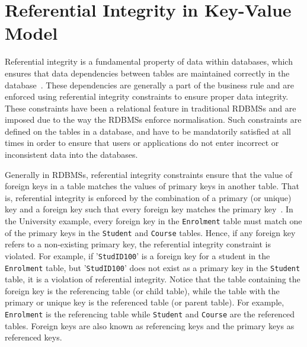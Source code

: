 \section{Referential Integrity in Key-Value
Model}\label{s:referential-integrity} 

Referential integrity is a fundamental property of data within databases, which
ensures that data dependencies between tables are maintained correctly in the
database~\citep{blaha,date,Navathe,george}.  These dependencies are generally a
part of the business rule and are enforced using referential integrity
constraints to ensure proper data integrity. These  constraints
have been a relational feature in traditional \acp{RDBMS} and are imposed due to
the way the \acp{RDBMS} enforce normalisation. Such  constraints are defined on
the tables in a database, and have to be mandatorily satisfied at all times in
order to ensure that users or applications do not enter incorrect or
inconsistent data into the databases.



Generally in \acp{RDBMS}, referential integrity constraints  ensure that the
value of foreign keys in a table matches the values of primary keys in another
table. That is, referential integrity is enforced by the combination of a
primary (or unique) key and a foreign key such that every foreign key matches
the primary key~\citep{blaha,Navathe,george,pathivada}.
In the University example,   every foreign key in the \texttt{Enrolment} table
must match one of the primary keys in the \texttt{Student} and \texttt{Course}
tables. Hence,   if any foreign key refers to a non-existing primary key,   the
referential integrity constraint is violated.   For example,   if
'\texttt{StudID100}' is a foreign key for a student in the \texttt{Enrolment}
table,   but '\texttt{StudID100}' does not exist as a primary key in the
\texttt{Student} table,   it is a violation of referential integrity.
Notice that the table containing the foreign key is the referencing table (or
child table), while the table with the primary or unique key is the referenced
table (or parent table). For example,  \texttt{Enrolment} is the referencing
table while \texttt{Student} and \texttt{Course} are the referenced tables.
Foreign keys are also known as  referencing keys and the primary keys as
referenced keys.




